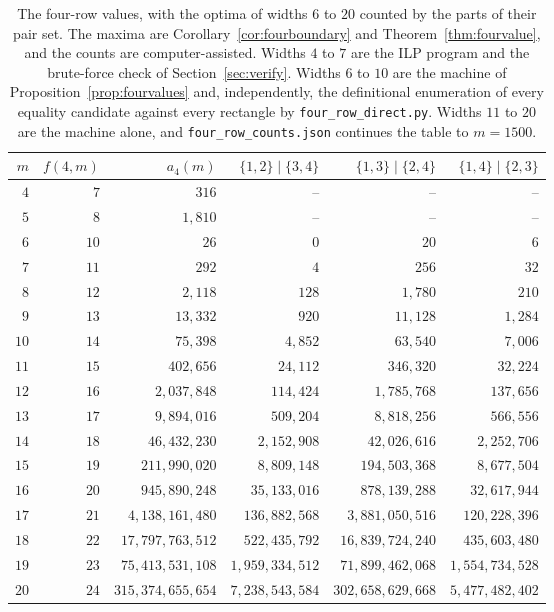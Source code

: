 \begin{table}[t]
\centering\footnotesize
\begin{tabular}{@{}rrrrrr@{}}
\toprule
$m$ & $f(4,m)$ & $a_4(m)$ & $\{1,2\}\mid\{3,4\}$ & $\{1,3\}\mid\{2,4\}$ & $\{1,4\}\mid\{2,3\}$\\
\midrule
$4$ & $7$ & $316$ & -- & -- & --\\
$5$ & $8$ & $1{,}810$ & -- & -- & --\\
$6$ & $10$ & $26$ & $0$ & $20$ & $6$\\
$7$ & $11$ & $292$ & $4$ & $256$ & $32$\\
$8$ & $12$ & $2{,}118$ & $128$ & $1{,}780$ & $210$\\
$9$ & $13$ & $13{,}332$ & $920$ & $11{,}128$ & $1{,}284$\\
$10$ & $14$ & $75{,}398$ & $4{,}852$ & $63{,}540$ & $7{,}006$\\
\midrule
$11$ & $15$ & $402{,}656$ & $24{,}112$ & $346{,}320$ & $32{,}224$\\
$12$ & $16$ & $2{,}037{,}848$ & $114{,}424$ & $1{,}785{,}768$ & $137{,}656$\\
$13$ & $17$ & $9{,}894{,}016$ & $509{,}204$ & $8{,}818{,}256$ & $566{,}556$\\
$14$ & $18$ & $46{,}432{,}230$ & $2{,}152{,}908$ & $42{,}026{,}616$ & $2{,}252{,}706$\\
$15$ & $19$ & $211{,}990{,}020$ & $8{,}809{,}148$ & $194{,}503{,}368$ & $8{,}677{,}504$\\
$16$ & $20$ & $945{,}890{,}248$ & $35{,}133{,}016$ & $878{,}139{,}288$ & $32{,}617{,}944$\\
$17$ & $21$ & $4{,}138{,}161{,}480$ & $136{,}882{,}568$ & $3{,}881{,}050{,}516$ & $120{,}228{,}396$\\
$18$ & $22$ & $17{,}797{,}763{,}512$ & $522{,}435{,}792$ & $16{,}839{,}724{,}240$ & $435{,}603{,}480$\\
$19$ & $23$ & $75{,}413{,}531{,}108$ & $1{,}959{,}334{,}512$ & $71{,}899{,}462{,}068$ & $1{,}554{,}734{,}528$\\
$20$ & $24$ & $315{,}374{,}655{,}654$ & $7{,}238{,}543{,}584$ & $302{,}658{,}629{,}668$ & $5{,}477{,}482{,}402$\\
\bottomrule
\end{tabular}
\caption{The four-row values, with the optima of widths $6$ to $20$ counted by the parts of their pair set. The maxima are Corollary~\ref{cor:fourboundary} and Theorem~\ref{thm:fourvalue}, and the counts are computer-assisted. Widths $4$ to $7$ are the ILP program and the brute-force check of Section~\ref{sec:verify}. Widths $6$ to $10$ are the machine of Proposition~\ref{prop:fourvalues} and, independently, the definitional enumeration of every equality candidate against every rectangle by \texttt{four\_row\_direct.py}. Widths $11$ to $20$ are the machine alone, and \texttt{four\_row\_counts.json} continues the table to $m=1500$.}
\label{tab:fourvalues}
\end{table}
